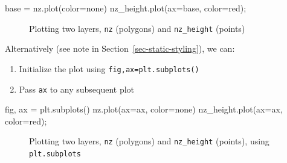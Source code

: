 \documentclass[
  letterpaper,
]{krantz}
\newenvironment{Shaded}{\begin{snugshade}}{\end{snugshade}}
\newcommand{\NormalTok}[1]{\textcolor[rgb]{0.00,0.23,0.31}{#1}}
\newcommand{\OperatorTok}[1]{\textcolor[rgb]{0.37,0.37,0.37}{#1}}
\newcommand{\StringTok}[1]{\textcolor[rgb]{0.13,0.47,0.30}{#1}}
\providecommand{\tightlist}{%
  \setlength{\itemsep}{0pt}\setlength{\parskip}{0pt}}\usepackage{longtable,booktabs,array}
\begin{document}
\begin{Shaded}
\begin{Highlighting}[]
\NormalTok{base }\OperatorTok{=}\NormalTok{ nz.plot(color}\OperatorTok{=}\StringTok{\textquotesingle{}none\textquotesingle{}}\NormalTok{)}
\NormalTok{nz\_height.plot(ax}\OperatorTok{=}\NormalTok{base, color}\OperatorTok{=}\StringTok{\textquotesingle{}red\textquotesingle{}}\NormalTok{)}\OperatorTok{;}
\end{Highlighting}
\end{Shaded}

\begin{figure}[H]


\caption{\label{fig-two-layers}Plotting two layers, \texttt{nz}
(polygons) and \texttt{nz\_height} (points)}

\end{figure}%

Alternatively (see note in Section~\ref{sec-static-styling}), we can:

\begin{enumerate}
\def\labelenumi{\arabic{enumi}.}
\tightlist
\item
  Initialize the plot using \texttt{fig,ax=plt.subplots()}
\item
  Pass \texttt{ax} to any subsequent plot
\end{enumerate}

\begin{Shaded}
\begin{Highlighting}[]
\NormalTok{fig, ax }\OperatorTok{=}\NormalTok{ plt.subplots()}
\NormalTok{nz.plot(ax}\OperatorTok{=}\NormalTok{ax, color}\OperatorTok{=}\StringTok{\textquotesingle{}none\textquotesingle{}}\NormalTok{)}
\NormalTok{nz\_height.plot(ax}\OperatorTok{=}\NormalTok{ax, color}\OperatorTok{=}\StringTok{\textquotesingle{}red\textquotesingle{}}\NormalTok{)}\OperatorTok{;}
\end{Highlighting}
\end{Shaded}

\begin{figure}[H]


\caption{\label{fig-two-layers2}Plotting two layers, \texttt{nz}
(polygons) and \texttt{nz\_height} (points), using
\texttt{plt.subplots}}

\end{figure}%
\end{document}
